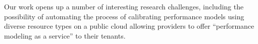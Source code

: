 Our work opens up a number of interesting research challenges, including the possibility of automating the process of calibrating performance models using diverse resource types on a public cloud allowing providers to offer ``performance modeling as a service'' to their tenants. 

\begin{comment}
~\bu{List of pending things:
\begin{itemize}
\item Minor fixes to Fig. 2
\item Explain the pros and cons of choosing R-2, explain implications of num cores and memory not being independent, other modeling concerns
\item Explain the idea behind performance modeling as a service more clearly
\item go over the list of PC members and ensure their papers are cited!
\end{itemize}
}
\end{comment}


